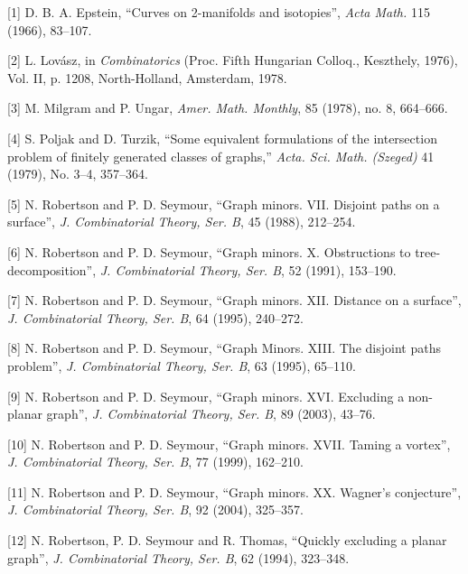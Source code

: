 
[1] D. B. A. Epstein, ``Curves on 2-manifolds and isotopies'', \textit{Acta Math.} 115 (1966), 83--107.

[2] L. Lov\'asz, in \textit{Combinatorics} (Proc. Fifth Hungarian Colloq., Keszthely, 1976), Vol. II, p. 1208, North-Holland, Amsterdam, 1978.

[3] M. Milgram and P. Ungar, \textit{Amer. Math. Monthly}, 85 (1978), no. 8, 664--666.

[4] S. Poljak and D. Turzik, ``Some equivalent formulations of the intersection problem of finitely generated classes of graphs,'' \textit{Acta. Sci. Math. (Szeged)} 41 (1979), No. 3--4, 357--364.

[5] N. Robertson and P. D. Seymour, ``Graph minors. VII. Disjoint paths on a surface'', \textit{J. Combinatorial Theory, Ser. B}, 45 (1988), 212--254.

[6] N. Robertson and P. D. Seymour, ``Graph minors. X. Obstructions to tree-decomposition'', \textit{J. Combinatorial Theory, Ser. B}, 52 (1991), 153--190.

[7] N. Robertson and P. D. Seymour, ``Graph minors. XII. Distance on a surface'', \textit{J. Combinatorial Theory, Ser. B}, 64 (1995), 240--272.

[8] N. Robertson and P. D. Seymour, ``Graph Minors. XIII. The disjoint paths problem'', \textit{J. Combinatorial Theory, Ser. B}, 63 (1995), 65--110.

[9] N. Robertson and P. D. Seymour, ``Graph minors. XVI. Excluding a non-planar graph'', \textit{J. Combinatorial Theory, Ser. B}, 89 (2003), 43--76.

[10] N. Robertson and P. D. Seymour, ``Graph minors. XVII. Taming a vortex'', \textit{J. Combinatorial Theory, Ser. B}, 77 (1999), 162--210.

[11] N. Robertson and P. D. Seymour, ``Graph minors. XX. Wagner's conjecture'', \textit{J. Combinatorial Theory, Ser. B}, 92 (2004), 325--357.

[12] N. Robertson, P. D. Seymour and R. Thomas, ``Quickly excluding a planar graph'', \textit{J. Combinatorial Theory, Ser. B}, 62 (1994), 323--348.
